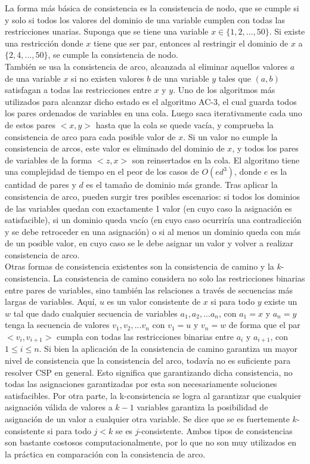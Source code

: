 \documentclass[12pt]{report}
\begin{document}
La forma más básica de consistencia es la consistencia de nodo, que se cumple si y solo si todos los valores del dominio de una variable cumplen con todas las restricciones unarias. Suponga que se tiene una variable $x \in \{1,2,...,50\}$. Si existe una restricción donde $x$ tiene que ser par, entonces al restringir el dominio de $x$ a $\{2,4,...,50\}$, se cumple la consistencia de nodo.\\

También se usa la consistencia de arco, alcanzada al eliminar aquellos valores $a$ de una variable $x$ si no existen valores $b$ de una variable $y$ tales que $(a,b)$ satisfagan a todas las restricciones entre $x$ y $y$. Uno de los algoritmos más utilizados para alcanzar dicho estado es el algoritmo AC-3, el cual guarda todos los pares ordenados de variables en una cola. Luego saca iterativamente cada uno de estos pares $<x,y>$ hasta que la cola se quede vacía, y comprueba la consistencia de arco para cada posible valor de $x$. Si un valor no cumple la consistencia de arcos, este valor es eliminado del dominio de $x$, y todos los pares de variables de la forma $<z,x>$ son reinsertados en la cola. El algoritmo tiene una complejidad de tiempo en el peor de los casos de $O(ed^3 )$, donde $e$ es la cantidad de pares y $d$ es el tamaño de dominio más grande. Tras aplicar la consistencia de arco, pueden surgir tres posibles escenarios: si todos los dominios de las variables quedan con exactamente 1 valor (en cuyo caso la asignación es satisfacible), si un dominio queda vacío (en cuyo caso ocurriría una contradicción y se debe retroceder en una asignación) o si al menos un dominio queda con más de un posible valor, en cuyo caso se le debe asignar un valor y volver a realizar consistencia de arco.\\

Otras formas de consistencia existentes son la consistencia de camino y la $k$-consistencia. La consistencia de camino considera no solo las restricciones binarias entre pares de variables, sino también las relaciones a través de secuencias más largas de variables. Aquí, $u$ es un valor consistente de $x$ si para todo $y$ existe un $w$ tal que dado cualquier secuencia de variables $a_1, a_2, ... a_n$, con $a_1=x$ y $a_n=y$ tenga la secuencia de valores $v_1, v_2, ... v_n$ con $v_1=u$ y $v_n=w$ de forma que el par $<v_i,v_{i+1}>$ cumpla con todas las restricciones binarias entre $a_i$ y $a_{i+1}$, con $1\leq  i \leq  n$. Si bien la aplicación de la consistencia de camino garantiza un mayor nivel de consistencia que la consistencia del arco, todavía no es suficiente para resolver CSP en general. Esto significa que garantizando dicha consistencia, no todas las asignaciones garantizadas por esta son necesariamente soluciones satisfacibles. Por otra parte, la k-consistencia se logra al garantizar que cualquier asignación válida de valores a $k-1$ variables garantiza la posibilidad de asignación de un valor a cualquier otra variable. Se dice que se es fuertemente $k$-consistente si para todo $j<k$ se es $j$-consistente. Ambos tipos de consistencias son bastante costosos computacionalmente, por lo que no son muy utilizados en la práctica en comparación con la consistencia de arco.\\
\end{document}
